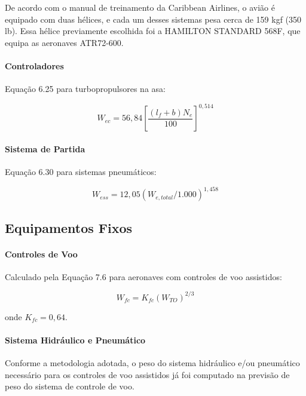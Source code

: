 De acordo com o manual de treinamento da Caribbean Airlines, o avião é equipado com duas hélices, e cada um desses sistemas pesa cerca de 159 kgf (350 lb). Essa hélice previamente escolhida foi a HAMILTON STANDARD 568F, que equipa as aeronaves ATR72-600.

\paragraph{Controladores}

Equação 6.25 para turbopropulsores na asa:

\begin{equation}
W_{ec} = 56,84 \left[ \frac{(l_f + b) N_e}{100} \right]^{0,514}
\end{equation}

\paragraph{Sistema de Partida}

Equação 6.30 para sistemas pneumáticos:

\begin{equation}
W_{ess} = 12,05 (W_{e,total} / 1.000)^{1,458}
\end{equation}


\subsection{Equipamentos Fixos}

\paragraph{Controles de Voo}

Calculado pela Equação 7.6 para aeronaves com controles de voo assistidos:

\begin{equation}
    W_{fc} = K_{fc} (W_{TO})^{2/3}
\end{equation}

onde $K_{fc} = 0,64$.

\paragraph{Sistema Hidráulico e Pneumático}

Conforme a metodologia adotada, o peso do sistema hidráulico e/ou pneumático necessário para os controles de voo assistidos já foi computado na previsão de peso do sistema de controle de voo.

